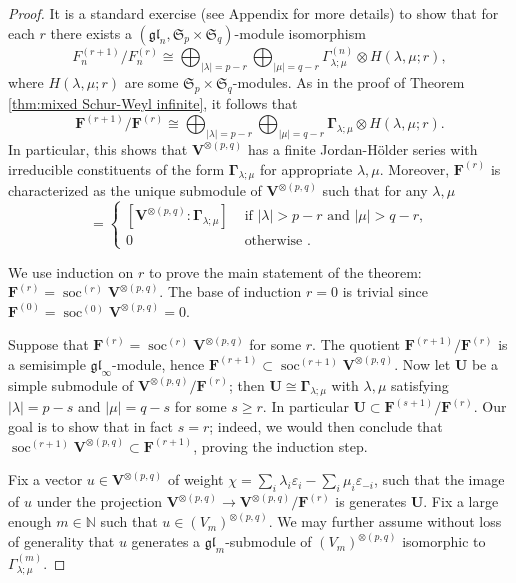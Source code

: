 \documentclass[12pt,reqno]{amsart}
\numberwithin{equation}{section}
\theoremstyle{plain}
\theoremstyle{definition}
\def\N{\mathbb N}
\def\eps{\varepsilon}
\def\gl{\mathfrak{gl}}
\def\soc{\operatorname{soc}}
\def\o{\otimes}
\def\glV_#1{\boldsymbol\Gamma_{#1}}
\def\FF{{\mathbf F}}
\def\VV{\mathbf V}
\begin{document}
\begin{proof}
It is a standard exercise (see Appendix for more details) to show
that for each $r$ there exists a $(\gl_n,\mathfrak S_p \times
\mathfrak S_q)$-module isomorphism
\begin{equation}\label{eq:middle layer finite}
    F_n^{(r+1)}/ F_{n}^{(r)} \cong \bigoplus_{|\lambda|=p-r} \bigoplus_{|\mu|=q-r}
    \varGamma_{\lambda;\mu}^{(n)} \o H(\lambda,\mu;r),
\end{equation}
where $H(\lambda,\mu;r)$ are some $\mathfrak S_p \times \mathfrak
S_q$-modules. As in the proof of Theorem \ref{thm:mixed Schur-Weyl
infinite}, it follows that
\begin{equation*}
    \FF^{(r+1)}/\FF^{(r)} \cong \bigoplus_{|\lambda|=p-r} \bigoplus_{|\mu|=q-r}
    \glV_{\lambda;\mu} \o H(\lambda,\mu;r).
\end{equation*}
In particular, this shows that $\VV^{\o(p,q)}$ has a finite
Jordan-H\"older series with irreducible constituents of the form $\glV_{\lambda;\mu}$ for appropriate $\lambda,\mu$. Moreover,
$\FF^{(r)}$ is characterized as the unique submodule of
$\VV^{\o(p,q)}$ such that for any $\lambda,\mu$
\begin{equation*}
    [\FF^{(r)}:\glV_{\lambda;\mu}] =
    \begin{cases}
    [\VV^{\o(p,q)}:\glV_{\lambda;\mu}] & \text{ if }|\lambda|>p-r \text{ and }
    |\mu|>q-r,\\
    0 &\text{ otherwise }.
    \end{cases}
\end{equation*}

We use induction on $r$ to prove the main statement of the theorem:
$\FF^{(r)} = \soc^{(r)} \VV^{\o(p,q)}$. The base of induction $r=0$
is trivial since $\FF^{(0)} = \soc^{(0)} \VV^{\o(p,q)} = 0$.

Suppose that $\FF^{(r)} = \soc^{(r)} \VV^{\o(p,q)}$ for some $r$.
The quotient $\FF^{(r+1)}/\FF^{(r)}$ is a semisimple
$\gl_\infty$-module, hence $\FF^{(r+1)} \subset \soc^{(r+1)}
\VV^{\o(p,q)}$. Now let $\mathbf U$ be a simple submodule of
$\VV^{\o(p,q)}/\FF^{(r)}$; then $\mathbf U \cong \glV_{\lambda;\mu}$
with $\lambda,\mu$ satisfying $|\lambda| = p-s$ and $|\mu| = q - s$
for some $s\ge r$. In particular $\mathbf U \subset
\FF^{(s+1)}/\FF^{(r)}$. Our goal is to show that in fact $s=r$;
indeed, we would then conclude that $\soc^{(r+1)} \VV^{\o(p,q)}
\subset \FF^{(r+1)}$, proving the induction step.

Fix a vector $u \in \VV^{\o(p,q)}$ of weight $\chi = \sum_i
\lambda_i \eps_i - \sum_i \mu_i \eps_{-i}$, such that the image of
$u$ under the projection $\VV^{\o(p,q)} \to \VV^{\o(p,q)}/\FF^{(r)}$
is generates $\mathbf U$. Fix a large enough $m \in \N$ such that $u
\in (V_m)^{\o(p,q)}$. We may further assume without loss of
generality that $u$ generates a $\gl_m$-submodule of
$(V_m)^{\o(p,q)}$ isomorphic to $\varGamma_{\lambda;\mu}^{(m)}$.


\end{proof}
\end{document}
